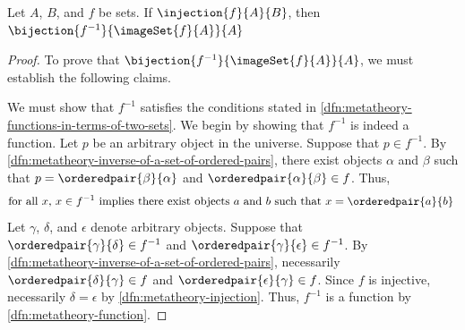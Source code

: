 \begin{thm}
     \label{thm:metatheory-if-a-function-is-injective-then-inverse-is-a-function}
    Let \( A \), \( B \), and \( f \) be sets.
    If \( \injection{f}{A}{B} \), then \( \bijection{f^{-1}}{\imageSet{f}{A}}{A} \)
\end{thm}

\begin{proof}
    To prove that \( \bijection{f^{-1}}{\imageSet{f}{A}}{A} \), we must establish the following claims.
    \begin{claim}
         \label{claim:f-inverse-is-a-function-on-image-of-A-under-f-into-A}
    \end{claim}
    \noindent
    We must show that \( f^{-1} \) satisfies the conditions stated in \cref{dfn:metatheory-functions-in-terms-of-two-sets}.
    We begin by showing that \( f^{-1} \) is indeed a function.
    Let \( p \) be an arbitrary object in the universe.
    Suppose that \( p \in f^{-1} \).
    By \cref{dfn:metatheory-inverse-of-a-set-of-ordered-pairs}, there exist objects \( \alpha \) and \( \beta \)
    such that \( p = \orderedpair{\beta}{\alpha} \) and \( \orderedpair{\alpha}{\beta} \in f \).
    Thus,
    \begin{equation*}
        \text{for all \( x \), \( x \in f^{-1} \) implies there exist objects \( a \) and \( b \) such that \( x = \orderedpair{a}{b} \) }
    \end{equation*}
    Let \( \gamma \), \( \delta \), and \( \epsilon \) denote arbitrary objects.
    Suppose that \( \orderedpair{\gamma}{\delta} \in f^{-1} \) and \( \orderedpair{\gamma}{\epsilon} \in f^{-1} \).
    By \cref{dfn:metatheory-inverse-of-a-set-of-ordered-pairs}, necessarily \( \orderedpair{\delta}{\gamma} \in f \) and \( \orderedpair{\epsilon}{\gamma} \in f \).
    Since \( f \) is injective, necessarily \( \delta = \epsilon \) by \cref{dfn:metatheory-injection}.
    Thus, \( f^{-1} \) is a function by \cref{dfn:metatheory-function}.


\end{proof}

